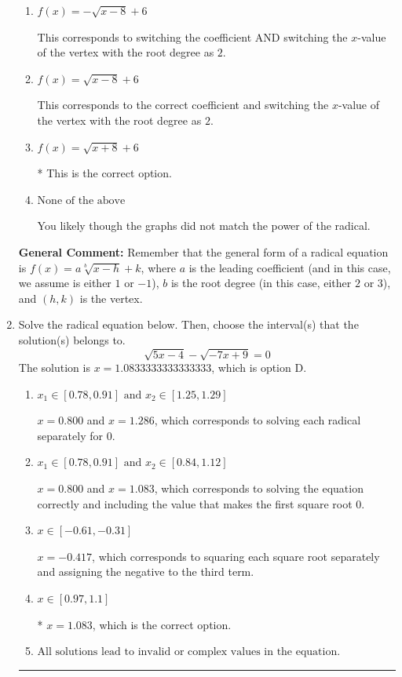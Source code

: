 \documentclass{extbook}[14pt]
\newcommand{\litem}[1]{\item #1

\rule{\textwidth}{0.4pt}}
\begin{document}
\begin{enumerate}
{\begin{enumerate}[label=\Alph*.]
This corresponds to switching the coefficient and having the correct vertex with the root degree as $2$.
\item \( f(x) = - \sqrt{x - 8} + 6 \)

This corresponds to switching the coefficient AND switching the $x$-value of the vertex with the root degree as $2$.
\item \( f(x) = \sqrt{x - 8} + 6 \)

This corresponds to the correct coefficient and switching the $x$-value of the vertex with the root degree as $2$.
\item \( f(x) = \sqrt{x + 8} + 6 \)

* This is the correct option.
\item \( \text{None of the above} \)

You likely though the graphs did not match the power of the radical.
\end{enumerate}

\textbf{General Comment:} Remember that the general form of a radical equation is $ f(x) = a \sqrt[b]{x - h} + k$, where $a$ is the leading coefficient (and in this case, we assume is either $1$ or $-1$), $b$ is the root degree (in this case, either $2$ or $3$), and $(h, k)$ is the vertex.
}
\litem{
Solve the radical equation below. Then, choose the interval(s) that the solution(s) belongs to.
\[ \sqrt{5 x - 4} - \sqrt{-7 x + 9} = 0 \]The solution is \( x = 1.0833333333333333 \), which is option D.\begin{enumerate}[label=\Alph*.]
\item \( x_1 \in [0.78, 0.91] \text{ and } x_2 \in [1.25,1.29] \)

$x = 0.800$ and $x = 1.286$, which corresponds to solving each radical separately for 0.
\item \( x_1 \in [0.78, 0.91] \text{ and } x_2 \in [0.84,1.12] \)

$x = 0.800$ and $x = 1.083$, which corresponds to solving the equation correctly and including the value that makes the first square root 0.
\item \( x \in [-0.61,-0.31] \)

$x = -0.417$, which corresponds to squaring each square root separately and assigning the negative to the third term.
\item \( x \in [0.97,1.1] \)

* $x = 1.083$, which is the correct option.
\item \( \text{All solutions lead to invalid or complex values in the equation.} \)


\end{enumerate}}
\end{enumerate}
\end{document}
